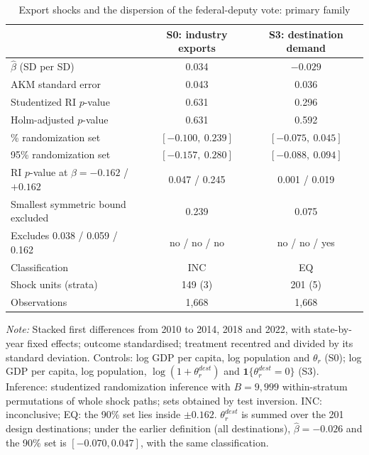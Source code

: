 \documentclass[
	11pt,				%
	oneside,			%
	a4paper,			%
	english,			%
	english				%
	]{abntex2ppgsi}
\theoremstyle{plain}
\theoremstyle{remark}
\theoremstyle{plain}%
\theoremstyle{remark}%
\begin{document}
\begin{table}[!htbp]
\centering
\caption{Export shocks and the dispersion of the federal-deputy vote: primary family}
\label{tab:primary}
\begin{threeparttable}
\small
\begin{tabular*}{\textwidth}{@{\extracolsep{\fill}}lcc@{}}
\toprule
 & S0: industry exports & S3: destination demand \\
\midrule
$\hat\beta$ (SD per SD) & 0.034 & $-0.029$ \\
AKM standard error & 0.043 & 0.036 \\
Studentized RI $p$-value & 0.631 & 0.296 \\
Holm-adjusted $p$-value & 0.631 & 0.592 \\
\addlinespace
90\% randomization set & $[-0.100,\ 0.239]$ & $[-0.075,\ 0.045]$ \\
95\% randomization set & $[-0.157,\ 0.280]$ & $[-0.088,\ 0.094]$ \\
RI $p$-value at $\beta = -0.162$ / $+0.162$ & 0.047 / 0.245 & 0.001 / 0.019 \\
Smallest symmetric bound excluded & 0.239 & 0.075 \\
\addlinespace
Excludes 0.038 / 0.059 / 0.162 & no / no / no & no / no / yes \\
Classification & INC & EQ \\
\addlinespace
Shock units (strata) & 149 (3) & 201 (5) \\
Observations & 1,668 & 1,668 \\
\bottomrule
\end{tabular*}
\begin{tablenotes}[flushleft]
\footnotesize
\item \textit{Note:} Stacked first differences from 2010 to 2014, 2018 and 2022, with state-by-year fixed effects; outcome standardised; treatment recentred and divided by its standard deviation. Controls: log GDP per capita, log population and $\theta_r$ (S0); log GDP per capita, log population, $\log(1+\theta^{dest}_r)$ and $\mathbf{1}\{\theta^{dest}_r = 0\}$ (S3). Inference: studentized randomization inference with $B=9{,}999$ within-stratum permutations of whole shock paths; sets obtained by test inversion. INC: inconclusive; EQ: the 90\% set lies inside $\pm 0.162$. $\theta^{dest}_r$ is summed over the 201 design destinations; under the earlier definition (all destinations), $\hat\beta = -0.026$ and the 90\% set is $[-0.070, 0.047]$, with the same classification.
\end{tablenotes}
\end{threeparttable}
\end{table}
\end{document}
